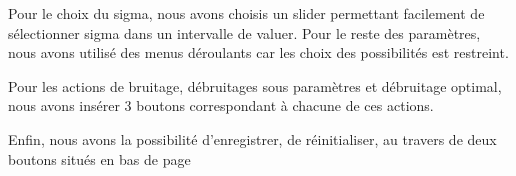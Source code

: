 Pour le choix du sigma, nous avons choisis un slider permettant facilement de sélectionner sigma dans un intervalle de valuer. Pour le reste des paramètres, nous avons utilisé des menus déroulants car les choix des possibilités est restreint. \par
Pour les actions de bruitage, débruitages sous paramètres et débruitage optimal, nous avons insérer 3 boutons correspondant à chacune de ces actions. \par
Enfin, nous avons la possibilité d'enregistrer, de réinitialiser,  au travers de deux boutons situés en bas de page
